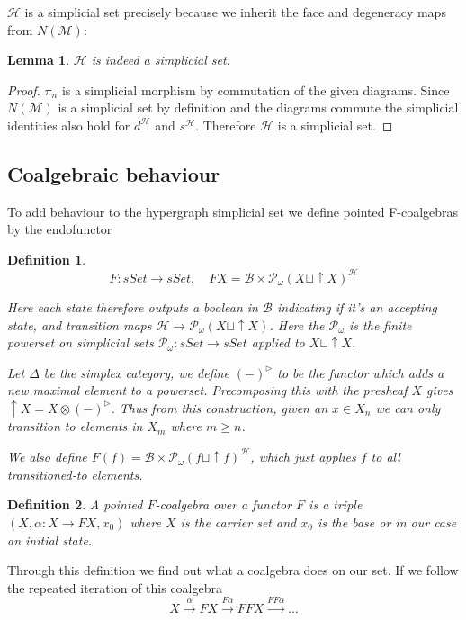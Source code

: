 \documentclass[12pt]{article}
\newtheorem{definition}{Definition}[section]
\newtheorem{lemma}{Lemma}[section]
\newcommand{\1}{\mathbbm{1}}
\newcommand{\B}{\mathcal{B}}
\newcommand{\M}{\mathcal{M}}
\renewcommand{\H}{\mathcal{H}}
\newcommand{\finP}{\mathcal{P}_{\omega}}
\begin{document}
$\H$ is a simplicial set precisely because we inherit the face and degeneracy maps from $N(\M)$:\\

\begin{lemma}
    $\H$ is indeed a simplicial set.
\end{lemma}

\begin{proof}
    $\pi_n$ is a simplicial morphism by commutation of the given diagrams. Since $N(\M)$ is a simplicial set by definition and the diagrams commute the simplicial identities also hold for $d^{\H}$ and $s^{\H}$. Therefore $\H$ is a simplicial set.
\end{proof}

\subsection{Coalgebraic behaviour}
To add behaviour to the hypergraph simplicial set we define pointed F-coalgebras by the endofunctor

\begin{definition}
    \[
        F: sSet \to sSet, \quad FX = \B \times \finP(X \sqcup \uparrow X)^{\H}
    \]
    
    Here each state therefore outputs a boolean in $\B$ indicating if it's an accepting state, and transition maps $\H \to \finP(X \sqcup \uparrow X)$. Here the $\finP$ is the finite powerset on simplicial sets $\finP: sSet \to sSet$ applied to $X\sqcup \uparrow X$.
    
    Let $\Delta$ be the simplex category, we define $(-)^{\rhd}$ to be the functor which adds a new maximal element to a powerset. Precomposing this with the presheaf $X$ gives $\uparrow X = X\otimes (-)^{\rhd}$. Thus from this construction, given an $x\in X_n$ we can only transition to elements in $X_m$ where $m\geq n$.
    
    We also define $F(f) = \B\times\finP(f \sqcup \uparrow f)^{\H}$, which just applies $f$ to all transitioned-to elements.
\end{definition}
\vspace{2em}
\begin{definition}
    A pointed $F$-coalgebra over a functor $F$ is a triple $(X, \alpha: X\to FX, x_0)$ where $X$ is the \emph{carrier set} and $x_0$ is the \emph{base} or in our case an \emph{initial state}.
\end{definition}

Through this definition we find out what a coalgebra does on our set. If we follow the repeated iteration of this coalgebra
\[
    X\xrightarrow{\alpha} FX \xrightarrow{F\alpha} FFX \xrightarrow{FF\alpha} \dots
\]
\end{document}

